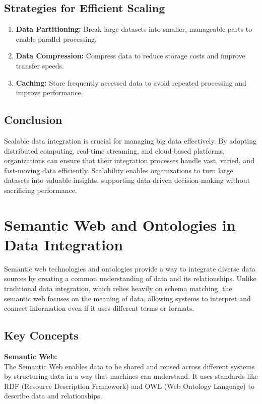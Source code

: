 \documentclass[12pt]{article}
\begin{document}
\subsection{Strategies for Efficient Scaling}
\begin{enumerate}
    \item \textbf{Data Partitioning:} Break large datasets into smaller, manageable parts to enable parallel processing.
    \item \textbf{Data Compression:} Compress data to reduce storage costs and improve transfer speeds.
    \item \textbf{Caching:} Store frequently accessed data to avoid repeated processing and improve performance.
\end{enumerate}

\subsection{Conclusion}
Scalable data integration is crucial for managing big data effectively. By adopting distributed computing, real-time streaming, and cloud-based platforms, organizations can ensure that their integration processes handle vast, varied, and fast-moving data efficiently. Scalability enables organizations to turn large datasets into valuable insights, supporting data-driven decision-making without sacrificing performance.

\section{Semantic Web and Ontologies in Data Integration}
Semantic web technologies and ontologies provide a way to integrate diverse data sources by creating a common understanding of data and its relationships. Unlike traditional data integration, which relies heavily on schema matching, the semantic web focuses on the meaning of data, allowing systems to interpret and connect information even if it uses different terms or formats.

\subsection{Key Concepts}
\textbf{Semantic Web:} \\
The Semantic Web enables data to be shared and reused across different systems by structuring data in a way that machines can understand. It uses standards like RDF (Resource Description Framework) and OWL (Web Ontology Language) to describe data and relationships.
\end{document}
